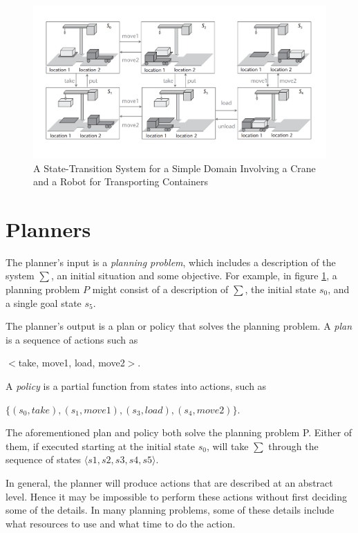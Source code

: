 \begin{figure}
  \centering
  \includegraphics[width=1\linewidth]{figures/state-transition-example.png}
  \caption{A State-Transition System for a Simple Domain Involving a Crane and a
    Robot for Transporting Containers}
  \label{fig:state-transition-diagram}
\end{figure}

\section{Planners}
The planner's input is a \textit{planning problem}, which includes a description
of the system $\sum$, an initial situation and some objective. For example, in
figure \ref{fig:state-transition-diagram}, a planning problem $P$ might consist
of a description of $\sum$, the initial state $s_0$, and a single goal state
$s_5$.

The planner's output is a plan or policy that solves the planning problem. A
\textit{plan} is a sequence of actions such as

\begin{sspara}
$<$take, move1, load, move2$>$.
\end{sspara}

A \textit{policy} is a partial function from states into actions, such as

\begin{sspara}
$\{(s_0, take), (s_1, move1), (s_3, load), (s_4, move2)\}$.
\end{sspara}

The aforementioned plan and policy both solve the planning problem P. Either of
them, if executed starting at the initial state $s_0$, will take $\sum$ through
the sequence of states $\langle s1, s2, s3, s4, s5 \rangle$.

In general, the planner will produce actions that are described at an abstract
level. Hence it may be impossible to perform these actions without first
deciding some of the details. In many planning problems, some of these details
include what resources to use and what time to do the action.

